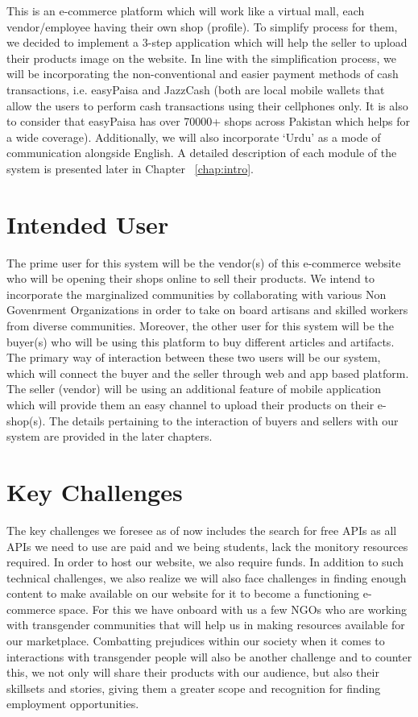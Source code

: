 This is an e-commerce platform which will work like a virtual mall, each vendor/employee having their
own shop (profile). To simplify process for them, we decided to implement a 3-step application which
will help the seller to upload their products image on the website.
In line with the simplification process, we will be incorporating the non-conventional and easier
payment methods of cash transactions, i.e. easyPaisa and JazzCash (both are local mobile wallets that
allow the users to perform cash transactions using their cellphones only. It is also to consider that
easyPaisa has over 70000+ shops across Pakistan which helps for a wide coverage).
Additionally, we will also incorporate ‘Urdu’ as a mode of communication alongside English. 
A detailed description of each module of the system is presented later in Chapter ~\ref{chap:intro}.

\section{Intended User}

The prime user for this system will be the vendor(s) of this e-commerce website who will be opening their shops online to sell their products. We intend to incorporate the marginalized communities by collaborating with various Non Govenrment Organizations in order to take on board artisans and skilled workers from diverse communities. Moreover, the other user for this system will be the buyer(s) who will be using this platform to buy different articles and artifacts. The primary way of interaction between these two users will be our system, which will connect the buyer and the seller through web and app based platform. The seller (vendor) will be using an additional feature of mobile application which will provide them an easy channel to upload their products on their e-shop(s). The details pertaining to the interaction of buyers and sellers with our system are provided in the later chapters.

\section{Key Challenges}

The key challenges we foresee as of now includes the search for free APIs as all APIs we need to use are paid and we being students, lack the monitory resources required. In order to host our website, we also require funds. In addition to such technical challenges, we also realize we will also face challenges in finding enough content to make available on our website for it to become a functioning e-commerce space. For this we have onboard with us a few NGOs who are working with transgender communities that will help us in making resources available for our marketplace. Combatting prejudices within our society when it comes to interactions with transgender people will also be another challenge and to counter this, we not only will share their products with our audience, but also their skillsets and stories, giving them a greater scope and recognition for finding employment opportunities. 